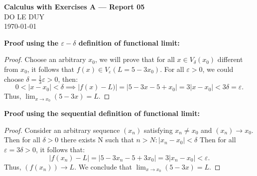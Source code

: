 
\newcommand{\myclass}{Calculus with Exercises A}
\newcommand{\myname}{DO LE DUY}
\newcommand{\myhwtype}{Report 05}
\newcommand{\questiontype}{Problem}
\newcommand{\writtensection}{5}



\thispagestyle{empty}
\begin{center}
  {\Large \textbf{\myclass{} — \myhwtype{} }} \\
  {\myname{} } \\
  \today
\end{center}

\begin{numedquestion}

\textbf{Proof using the $\varepsilon - \delta$ definition of functional limit:}
\begin{proof}
Choose an arbitrary $x_0$, we will prove that for all $x \in V_{\delta}(x_0)$ different from $x_0$, it follows that $f(x) \in V_{\varepsilon}(L = 5 - 3x_0)$. \newline
For all $\varepsilon > 0$, we could choose $\delta = \frac{1}{3} \varepsilon > 0$, then:
\[0 < |x - x_0| < \delta \implies |f(x)  - L)| = |5 - 3x - 5 + x_0| = 3|x - x_0| < 3\delta = \varepsilon.\]
Thus, $\lim _{x \rightarrow x_{0}}(5-3 x) = L$.
\end{proof}
\textbf{Proof using the sequential definition of functional limit:}
\begin{proof}
Consider an arbitrary sequence $(x_n)$ satisfying $x_n \neq x_0$ and $(x_n) \rightarrow x_0$. Then for all $\delta > 0$ there exists N such that $ n > N: |x_n - x_0| < \delta$
Then for all \(\varepsilon = 3\delta > 0\), it follows that:
\[ |f(x_n) - L| = |5 - 3x_n -5 + 3x_0|  = 3|x_n - x_0|< \varepsilon.\]
Thus, $(f(x_n)) \rightarrow L$. We conclude that $\lim _{x \rightarrow x_{0}}(5-3 x) = L$.
\end{proof}
\end{numedquestion}

